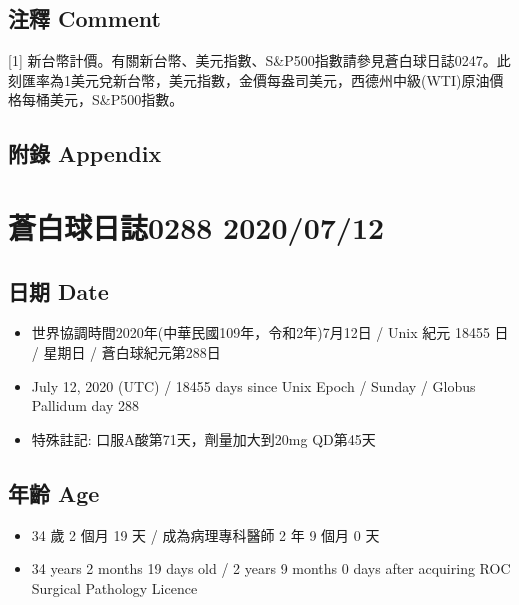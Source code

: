 \documentclass[a5paper, 11pt
]{book}
\providecommand{\tightlist}{%
  \setlength{\itemsep}{0pt}\setlength{\parskip}{0pt}}
\begin{document}
\hypertarget{ux6ce8ux91cb-comment-40}{%
\subsection{注釋 Comment}\label{ux6ce8ux91cb-comment-40}}

{[}1{]}
新台幣計價。有關新台幣、美元指數、S\&P500指數請參見蒼白球日誌0247。此刻匯率為1美元兌新台幣，美元指數，金價每盎司美元，西德州中級(WTI)原油價格每桶美元，S\&P500指數。

\hypertarget{ux9644ux9304-appendix-40}{%
\subsection{附錄 Appendix}\label{ux9644ux9304-appendix-40}}

\hypertarget{ux84bcux767dux7403ux65e5ux8a8c0288-20200712}{%
\section{蒼白球日誌0288
2020/07/12}\label{ux84bcux767dux7403ux65e5ux8a8c0288-20200712}}

\hypertarget{ux65e5ux671f-date-41}{%
\subsection{日期 Date}\label{ux65e5ux671f-date-41}}

\begin{itemize}
\tightlist
\item
  世界協調時間2020年(中華民國109年，令和2年)7月12日 / Unix 紀元 18455 日
  / 星期日 / 蒼白球紀元第288日
\item
  July 12, 2020 (UTC) / 18455 days since Unix Epoch / Sunday / Globus
  Pallidum day 288
\item
  特殊註記: 口服A酸第71天，劑量加大到20mg QD第45天
\end{itemize}

\hypertarget{ux5e74ux9f61-age-41}{%
\subsection{年齡 Age}\label{ux5e74ux9f61-age-41}}

\begin{itemize}
\tightlist
\item
  34 歲 2 個月 19 天 / 成為病理專科醫師 2 年 9 個月 0 天
\item
  34 years 2 months 19 days old / 2 years 9 months 0 days after
  acquiring ROC Surgical Pathology Licence
\end{itemize}
\end{document}
